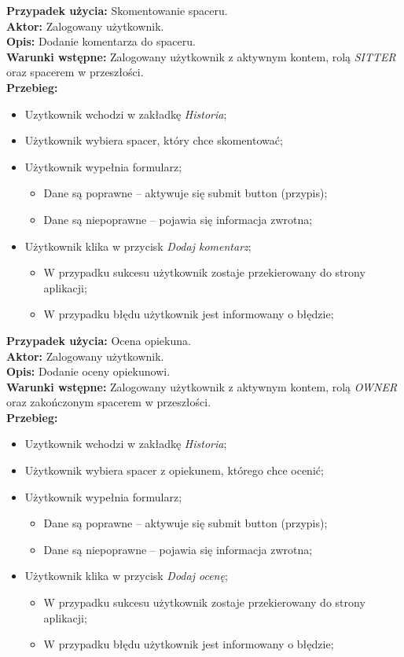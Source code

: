 \noindent
\textbf{Przypadek użycia:}  Skomentowanie spaceru. \\
\textbf{Aktor:} Zalogowany użytkownik. \\
\textbf{Opis:} Dodanie komentarza do spaceru. \\
\textbf{Warunki wstępne:} Zalogowany użytkownik z aktywnym kontem, rolą \textit{SITTER} oraz spacerem w przeszłości. \\
\textbf{Przebieg:}
\begin{itemize}
    \item Uzytkownik wchodzi w zakładkę \textit{Historia};
    \item Użytkownik wybiera spacer, który chce skomentować;
    \item Użytkownik wypełnia formularz;
    \begin{itemize}
        \item Dane są poprawne -- aktywuje się submit button (przypis);
        \item Dane są niepoprawne -- pojawia się informacja zwrotna;
    \end{itemize}
    \item Użytkownik klika w przycisk \textit{Dodaj komentarz};
    \begin{itemize}
        \item W przypadku sukcesu użytkownik zostaje przekierowany do strony aplikacji;
        \item W przypadku błędu użytkownik jest informowany o błędzie;
    \end{itemize}
\end{itemize}

\noindent
\textbf{Przypadek użycia:} Ocena opiekuna. \\
\textbf{Aktor:} Zalogowany użytkownik. \\
\textbf{Opis:} Dodanie oceny opiekunowi. \\
\textbf{Warunki wstępne:}  Zalogowany użytkownik z aktywnym kontem, rolą \textit{OWNER} oraz zakończonym spacerem w przeszłości. \\
\textbf{Przebieg:}
\begin{itemize}
    \item Uzytkownik wchodzi w zakładkę \textit{Historia};
    \item Użytkownik wybiera spacer z opiekunem, którego chce ocenić;
    \item Użytkownik wypełnia formularz;
    \begin{itemize}
        \item Dane są poprawne -- aktywuje się submit button (przypis);
        \item Dane są niepoprawne -- pojawia się informacja zwrotna;
    \end{itemize}
    \item Użytkownik klika w przycisk \textit{Dodaj ocenę};
    \begin{itemize}
        \item W przypadku sukcesu użytkownik zostaje przekierowany do strony aplikacji;
        \item W przypadku błędu użytkownik jest informowany o błędzie;
    \end{itemize}
\end{itemize}

